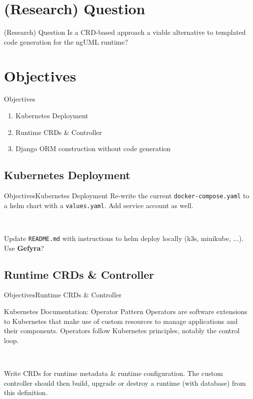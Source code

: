 \documentclass{beamer}
\begin{document}
\section{(Research) Question}

\begin{frame}{(Research) Question}
    Is a CRD-based approach a viable alternative to templated 
    code generation for the ngUML runtime?
\end{frame}

\section{Objectives}

\begin{frame}{Objectives}
    \begin{enumerate}
        \item Kubernetes Deployment
        \item Runtime CRDs \& Controller
        \item Django ORM construction without code generation
    \end{enumerate}
\end{frame}

\subsection{Kubernetes Deployment}

\begin{frame}{Objectives}{Kubernetes Deployment}
    Re-write the current \texttt{docker-compose.yaml} to a
    helm chart with a \texttt{values.yaml}. Add service
    account as well.

    ~

    Update \texttt{README.md} with instructions to helm 
    deploy locally (k3s, minikube, ...). Use \textbf{Gefyra}?
\end{frame}

\subsection{Runtime CRDs \& Controller}

\begin{frame}{Objectives}{Runtime CRDs \& Controller}
    \begin{block}{Kubernetes Documentation: Operator Pattern}
        Operators are software extensions to Kubernetes that make use of custom resources to manage applications and their components. Operators follow Kubernetes principles, notably the control loop.
    \end{block}

    ~

    Write CRDs for runtime metadata \& runtime configuration. 
    The custom controller should then build, upgrade or destroy a 
    runtime (with database) from this definition.
\end{frame}
\end{document}
